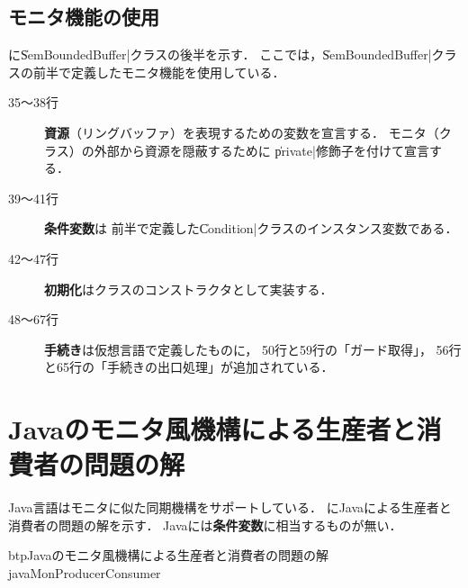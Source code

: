 \subsection{モニタ機能の使用}
に\|SemBoundedBuffer|クラスの後半を示す．
ここでは，\|SemBoundedBuffer|クラスの前半で定義したモニタ機能を使用している．

\begin{description}
\item [35〜38行]
{\bf 資源}（リングバッファ）を表現するための変数を宣言する．
モニタ（クラス）の外部から資源を隠蔽するために
\|private|修飾子を付けて宣言する．

\item [39〜41行]
{\bf 条件変数}は
前半で定義した\|Condition|クラスのインスタンス変数である．

\item [42〜47行]
{\bf 初期化}はクラスのコンストラクタとして実装する．

\item [48〜67行]
{\bf 手続き}は仮想言語で定義したものに，
50行と59行の「ガード取得」，
56行と65行の「手続きの出口処理」が追加されている．

\end{description}

% 
% 

\section{Javaのモニタ風機構による生産者と消費者の問題の解}
Java言語はモニタに似た同期機構をサポートしている．
にJavaによる生産者と消費者の問題の解を示す．
Javaには{\bf 条件変数}に相当するものが無い．

\begin{myfig}{btp}{Javaのモニタ風機構による生産者と消費者の問題の解}
{javaMonProducerConsumer}

\end{myfig}

